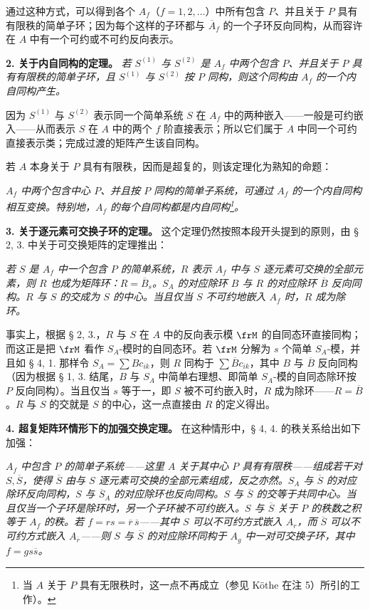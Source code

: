 通过这种方式，可以得到各个 \(A_f\)（\(f=1,2,\ldots\)）中所有包含 \(P\)、并且关于 \(P\) 具有有限秩的简单子环；因为每个这样的子环都与 \(\overline A_f\) 的一个子环反向同构，从而容许在 \(A\) 中有一个可约或不可约反向表示。

\noindent\textbf{2. 关于内自同构的定理。} \emph{若 \(S^{(1)}\) 与 \(S^{(2)}\) 是 \(A_f\) 中两个包含 \(P\)、并且关于 \(P\) 具有有限秩的简单子环，且 \(S^{(1)}\) 与 \(S^{(2)}\) 按 \(P\) 同构，则这个同构由 \(A_f\) 的一个内自同构产生。}

因为 \(S^{(1)}\) 与 \(S^{(2)}\) 表示同一个简单系统 \(S\) 在 \(A_f\) 中的两种嵌入——一般是可约嵌入——从而表示 \(S\) 在 \(A\) 中的两个 \(f\) 阶直接表示；所以它们属于 \(A\) 中同一个可约直接表示类；完成过渡的矩阵产生该自同构。

若 \(A\) 本身关于 \(P\) 具有有限秩，因而是超复的，则该定理化为熟知的命题：

\emph{\(A_f\) 中两个包含中心 \(P\)、并且按 \(P\) 同构的简单子系统，可通过 \(A_f\) 的一个内自同构相互变换。特别地，\(A_f\) 的每个自同构都是内自同构\footnote{\normalfont 当 \(A\) 关于 \(P\) 具有无限秩时，这一点不再成立（参见 Köthe 在注 5）所引的工作）。}。}

\noindent\textbf{3. 关于逐元素可交换子环的定理。}
这个定理仍然按照本段开头提到的原则，由 § 2, 3. 中关于可交换矩阵的定理推出：

\emph{若 \(S\) 是 \(A_f\) 中一个包含 \(P\) 的简单系统，\(R\) 表示 \(A_f\) 中与 \(S\) 逐元素可交换的全部元素，则 \(R\) 也成为矩阵环：\(R=\overline B_s\)。\(S_A\) 的对应除环 \(B\) 与 \(R\) 的对应除环 \(\overline B\) 反向同构。\(R\) 与 \(S\) 的交成为 \(S\) 的中心。当且仅当 \(S\) 不可约地嵌入 \(A_f\) 时，\(R\) 成为除环。}

事实上，根据 § 2, 3.，\(R\) 与 \(S\) 在 \(A\) 中的反向表示模 \(\frM\) 的自同态环直接同构；而这正是把 \(\frM\) 看作 \(S_A\)-模时的自同态环。若 \(\frM\) 分解为 \(s\) 个简单 \(S_A\)-模，并且如 § 4, 1. 那样令 \(S_A=\sum Bc_{ik}\)，则 \(R\) 同构于 \(\sum \overline Bc_{ik}\)，其中 \(B\) 与 \(\overline B\) 反向同构（因为根据 § 1, 3. 结尾，\(B\) 与 \(S_A\) 中简单右理想、即简单 \(S_A\)-模的自同态除环按 \(P\) 反向同构）。当且仅当 \(s\) 等于一，即 \(S\) 被不可约嵌入时，\(R\) 成为除环——\(R=\overline B\)。\(R\) 与 \(S\) 的交就是 \(S\) 的中心，这一点直接由 \(R\) 的定义得出。

\noindent\textbf{4. 超复矩阵环情形下的加强交换定理。} 在这种情形中，§ 4, 4. 的秩关系给出如下加强：

\emph{\(A_f\) 中包含 \(P\) 的简单子系统——这里 \(A\) 关于其中心 \(P\) 具有有限秩——组成若干对 \(S,\overline S\)，使得 \(\overline S\) 由与 \(S\) 逐元素可交换的全部元素组成，反之亦然。\(S_A\) 与 \(\overline S\) 的对应除环反向同构，\(S\) 与 \(\overline S_A\) 的对应除环也反向同构。\(S\) 与 \(\overline S\) 的交等于共同中心。当且仅当一个子环是除环时，另一个子环被不可约嵌入。\(S\) 与 \(\overline S\) 关于 \(P\) 的秩数之积等于 \(A_f\) 的秩。若 \(f=rs=\overline r\,\overline s\)——其中 \(S\) 可以不可约方式嵌入 \(A_r\)，而 \(\overline S\) 可以不可约方式嵌入 \(A_{\overline r}\)——则 \(S\) 与 \(\overline S\) 的对应除环同构于 \(A_g\) 中一对可交换子环，其中 \(f=g s\overline s\)。}

